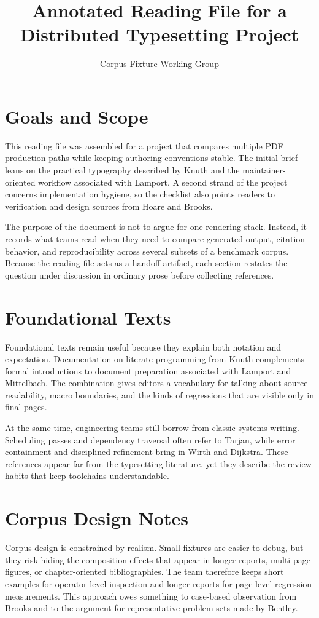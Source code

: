\documentclass{article}
\begin{document}
\title{Annotated Reading File for a Distributed Typesetting Project}
\author{Corpus Fixture Working Group}
\date{}
\maketitle
\tableofcontents

\section{Goals and Scope}
This reading file was assembled for a project that compares multiple PDF
production paths while keeping authoring conventions stable. The initial brief
leans on the practical typography described by Knuth and the
maintainer-oriented workflow associated with Lamport. A second strand of the
project concerns implementation hygiene, so the checklist also points readers to
verification and design sources from Hoare and Brooks.

The purpose of the document is not to argue for one rendering stack. Instead,
it records what teams read when they need to compare generated output, citation
behavior, and reproducibility across several subsets of a benchmark corpus.
Because the reading file acts as a handoff artifact, each section restates the
question under discussion in ordinary prose before collecting references.

\section{Foundational Texts}
Foundational texts remain useful because they explain both notation and
expectation. Documentation on literate programming from Knuth complements
formal introductions to document preparation associated with Lamport and
Mittelbach. The
combination gives editors a vocabulary for talking about source readability,
macro boundaries, and the kinds of regressions that are visible only in final
pages.

At the same time, engineering teams still borrow from classic systems writing.
Scheduling passes and dependency traversal often refer to Tarjan, while
error containment and disciplined refinement bring in Wirth and Dijkstra. These
references appear far from the typesetting literature,
yet they describe the review habits that keep toolchains understandable.

\clearpage
\section{Corpus Design Notes}
Corpus design is constrained by realism. Small fixtures are easier to debug, but
they risk hiding the composition effects that appear in longer reports,
multi-page figures, or chapter-oriented bibliographies. The team therefore keeps
short examples for operator-level inspection and longer reports for page-level
regression measurements. This approach owes something to case-based observation
from Brooks and to the argument for representative problem sets made by Bentley.
\end{document}
